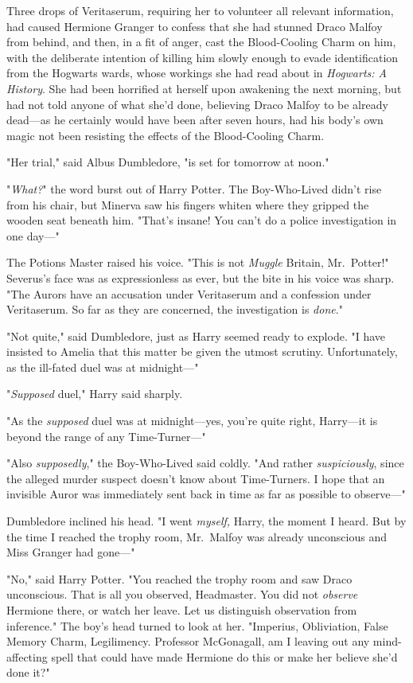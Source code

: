Three drops of Veritaserum, requiring her to volunteer all relevant 
information, had caused Hermione Granger to confess that she had stunned Draco 
Malfoy from behind, and then, in a fit of anger, cast the Blood-Cooling Charm 
on him, with the deliberate intention of killing him slowly enough to evade 
identification from the Hogwarts wards, whose workings she had read about in 
\emph{Hogwarts: A History}. She had been horrified at herself upon awakening 
the next morning, but had not told anyone of what she'd done, believing Draco 
Malfoy to be already dead---as he certainly would have been after seven hours, 
had his body's own magic not been resisting the effects of the Blood-Cooling 
Charm.

"Her trial," said Albus Dumbledore, "is set for tomorrow at noon."

"\emph{What?}" the word burst out of Harry Potter. The Boy-Who-Lived didn't 
rise from his chair, but Minerva saw his fingers whiten where they gripped the 
wooden seat beneath him. "That's insane! You can't do a police investigation in 
one day---"

The Potions Master raised his voice. "This is not \emph{Muggle} Britain, 
Mr.~Potter!" Severus's face was as expressionless as ever, but the bite in his 
voice was sharp. "The Aurors have an accusation under Veritaserum and a 
confession under Veritaserum. So far as they are concerned, the investigation 
is \emph{done}."

"Not quite," said Dumbledore, just as Harry seemed ready to explode. "I have 
insisted to Amelia that this matter be given the utmost scrutiny. 
Unfortunately, as the ill-fated duel was at midnight---"

"\emph{Supposed} duel," Harry said sharply.

"As the \emph{supposed} duel was at midnight---yes, you're quite right, 
Harry---it is beyond the range of any Time-Turner---"

"Also \emph{supposedly}," the Boy-Who-Lived said coldly. "And rather 
\emph{suspiciously}, since the alleged murder suspect doesn't know about 
Time-Turners. I hope that an invisible Auror was immediately sent back in time 
as far as possible to observe---"

Dumbledore inclined his head. "I went \emph{myself,} Harry, the moment I heard. 
But by the time I reached the trophy room, Mr.~Malfoy was already unconscious 
and Miss Granger had gone---"

"No," said Harry Potter. "You reached the trophy room and saw Draco 
unconscious. That is all you observed, Headmaster. You did not \emph{observe} 
Hermione there, or watch her leave. Let us distinguish observation from 
inference." The boy's head turned to look at her. "Imperius, Obliviation, False 
Memory Charm, Legilimency. Professor McGonagall, am I leaving out any 
mind-affecting spell that could have made Hermione do this or make her believe 
she'd done it?"

